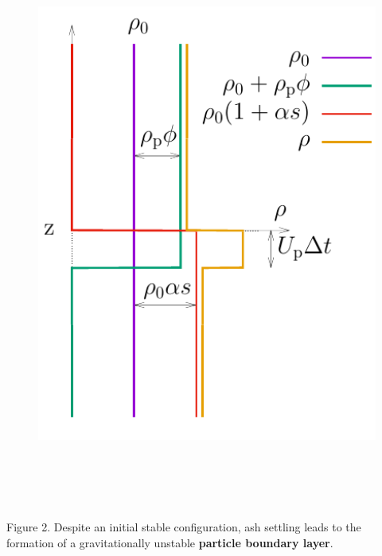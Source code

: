 \documentclass[final]{beamer} %
\begin{document}
\begin{frame}[t]
\begin{columns}[t]
\begin{column}{0.3\paperwidth}
\begin{columns}[t]
\begin{column}{0.17\paperwidth}
          \begin{figure}
            \includegraphics[height=18cm]{unstable_config.pdf}
          \end{figure}
        \end{column}
        
      \end{columns}

      \vspace{-1cm}

      \centering \footnotesize Figure 2. Despite an initial stable
      configuration, ash settling leads to the formation of a gravitationally
      unstable \textbf{particle boundary layer}.

      \vspace{1cm}

      \normalsize


\end{column}
\end{columns}
\end{frame}
\end{document}
